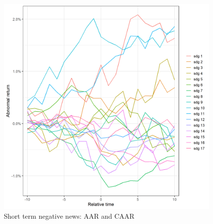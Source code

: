 \begin{figure}
    \centering
    \includegraphics[scale=0.6]{Projekt/1.Figures analysis/ST_negative_sdgs.png}
    \caption{Short term negative news: AAR and CAAR}
    \label{fig:ST_pos_news}
\end{figure}